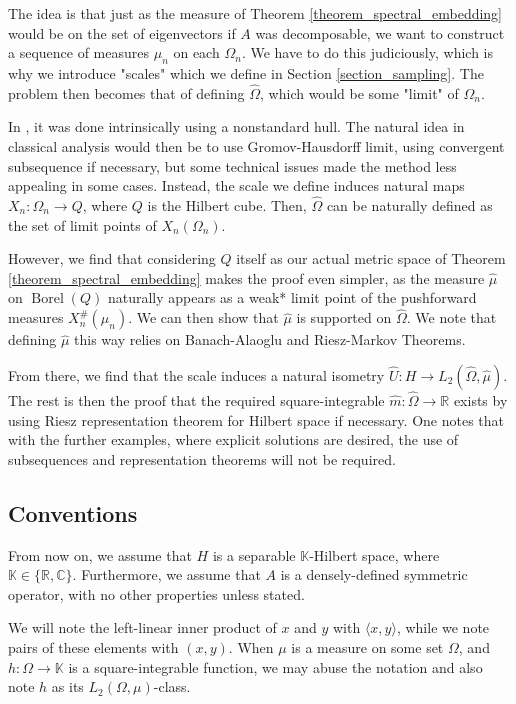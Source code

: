 \documentclass{amsart}
\theoremstyle{definition}
\theoremstyle{remark}
\def \Borel{\operatorname{Borel}}
\def \HOM{\hat{\Omega}}
\def \HMU{\hat{\mu}}
\def \HU{\hat{U}}
\def \Hm{\hat{m}}
\def \LL{\langle}
\def \RR{\rangle}
\begin{document}
The idea is that just as the measure of Theorem \ref{theorem_spectral_embedding} would be on the set of eigenvectors if $A$ was decomposable, we want to construct a sequence of measures $\mu_n$ on each $\Omega_n.$ We have to do this judiciously, which is why we introduce "scales" which we define in Section \ref{section_sampling}. The problem then becomes that of defining $\HOM$, which would be some "limit" of $\Omega_n$. 

In \cite{nonez2024spectralequivalencesnonstandardsamplings}, it was done intrinsically using a nonstandard hull. The natural idea in classical analysis would then be to use Gromov-Hausdorff limit, using convergent subsequence if necessary, but some technical issues made the method less appealing in some cases. Instead, the scale we define induces natural maps $X_n:\Omega_n\rightarrow Q$, where $Q$ is the Hilbert cube. Then, $\HOM$ can be naturally defined as the set of limit points of $X_n(\Omega_n).$ 

However, we find that considering $Q$ itself as our actual metric space of Theorem \ref{theorem_spectral_embedding} makes the proof even simpler, as the measure $\HMU$ on $\Borel(Q)$ naturally appears as a weak* limit point of the pushforward measures $X_n^{\#}(\mu_n)$. We can then show that $\HMU$ is supported on $\HOM$. We note that defining $\HMU$ this way relies on Banach-Alaoglu and Riesz-Markov Theorems.


From there, we find that the scale induces a natural isometry $\HU: H\rightarrow L_2(\HOM,\HMU).$ The rest is then the proof that the required square-integrable $\Hm:\HOM\rightarrow\mathbb{R}$ exists by using Riesz representation theorem for Hilbert space if necessary. One notes that with the further examples, where explicit solutions are desired, the use of subsequences and representation theorems will not be required.


\subsection{Conventions}

From now on, we assume that $H$ is a separable $\mathbb{K}$-Hilbert space, where $\mathbb{K}\in\{\mathbb{R}, \mathbb{C} \}.$ Furthermore, we assume that $A$ is a densely-defined symmetric operator, with no other properties unless stated.

We will note the left-linear inner product of $x$ and $y$ with $\LL x,y\RR$, while we note pairs of these elements with $(x,y). $ When $\mu$ is a measure on some set $\Omega$, and $h:\Omega\rightarrow\mathbb{K}$ is a square-integrable function, we may abuse the notation and also note $h$ as its $L_2(\Omega,\mu)$-class.
\end{document}
